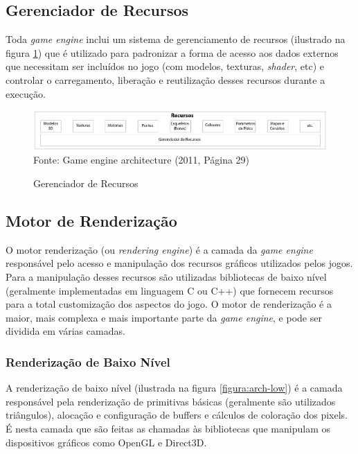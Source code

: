 \documentclass[12pt,	openright, twoside,	a4paper, english, french, spanish, brazil]{abntex2}
\begin{document}
\subsection{Gerenciador de Recursos}
Toda \textit{game engine} inclui um sistema de gerenciamento de recursos (ilustrado na figura \ref{figura:arch_res}) que é utilizado para padronizar a forma de acesso aos dados externos que necessitam ser incluídos no jogo (com modelos, texturas, \textit{shader}, etc) e controlar o carregamento, liberação e reutilização desses recursos durante a execução.

\begin{figure}[H]
\centering
\caption{Gerenciador de Recursos}
\includegraphics[width=16cm]{imagens/arch-res.png}
\\
\small{Fonte: Game engine architecture (2011, Página 29)}
\label{figura:arch_res}
\end{figure}

\subsection{Motor de Renderização}
O motor renderização (ou \textit{rendering engine}) é a camada da \textit{game engine} responsável pelo acesso e manipulação dos recursos gráficos utilizados pelos jogos. Para a manipulação desses recursos são utilizadas bibliotecas de baixo nível (geralmente implementadas em linguagem C ou C++) que fornecem recursos para a total customização dos aspectos do jogo. O motor de renderização é a maior, mais complexa e mais importante parte da \textit{game engine}, e pode ser dividida em várias camadas.

\subsubsection{Renderização de Baixo Nível}
A renderização de baixo nível (ilustrada na figura \ref{figura:arch-low}) é a camada responsável pela renderização de primitivas básicas (geralmente são utilizados triângulos), alocação e configuração de buffers e cálculos de coloração dos pixels. É nesta camada que são feitas as chamadas às bibliotecas que manipulam os dispositivos gráficos como OpenGL e Direct3D.
\end{document}
